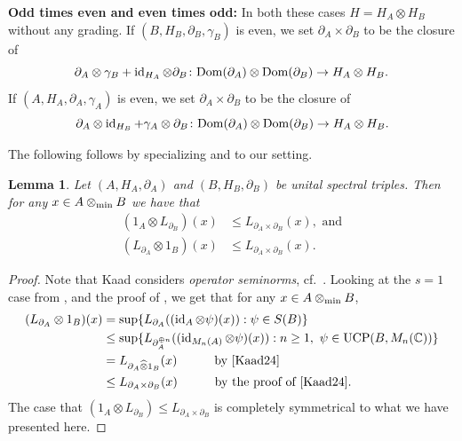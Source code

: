 \documentclass[11pt, a4paper, oneside, final, reqno]{amsart}
\newcommand{\bbC}{\mathbb{C}}
\newcommand{\UCP}{\operatorname{UCP}}
\newcommand{\id}{\operatorname{id}}
\theoremstyle{definition}
\theoremstyle{plain}
\newtheorem{lemma}[definition]{Lemma}
\theoremstyle{remark}
\numberwithin{equation}{section}
\begin{document}
\medskip \textbf{Odd times even and even times odd:} In both these cases $H = H_A \otimes H_B$ without any grading. If $(B,H_B,\partial_B,\gamma_B)$ is even, we set $\partial_A \times \partial_B$ to be the closure of
\begin{equation*}
    \partial_A \otimes \gamma_B + \id_{H_A} \otimes \partial_B \colon {\rm Dom}(\partial_A) \otimes {\rm Dom}(\partial_B) \to H_A \otimes H_B.
\end{equation*}
If $(A,H_A,\partial_A,\gamma_A)$ is even, we set $\partial_A \times \partial_B$ to be the closure of
\begin{equation*}
     \partial_A \otimes \id_{H_B} + \gamma_A \otimes \partial_B \colon {\rm Dom}(\partial_A) \otimes {\rm Dom}(\partial_B) \to H_A \otimes H_B.
\end{equation*}

The following follows by specializing \cite[Proposition 4.10]{Kaad24} and \cite[Theorem 7.1]{Kaad24} to our setting.

\begin{lemma}\label{thm:spectral triples Kaad}
    Let $(A,H_A,\partial_A)$ and $(B,H_B,\partial_B)$ be unital spectral triples. Then for any $x \in A \otimes_{\rm min} B$ we have that
    \begin{align*}
        (1_A \otimes L_{\partial_B})(x) & \leq L_{\partial_A \times \partial_B}(x), \text{ and} \\
        (L_{\partial_A} \otimes 1_B)(x) & \leq L_{\partial_A \times \partial_B}(x).
    \end{align*}
\end{lemma}
\begin{proof}
    Note that Kaad considers \emph{operator seminorms}, cf.~\cite[Definition 4.1]{Kaad24}. Looking at the $s = 1$ case from \cite[Proposition 4.10]{Kaad24}, and the proof of \cite[Theorem 7.1]{Kaad24}, we get that for any $x \in A \otimes_{\rm min} B$,
    \begin{align*}
        (L_{\partial_A} \otimes 1_B)(x)
        & = \sup\{ L_{\partial_A}((\id_{A} \otimes \psi)(x)) : \psi \in S(B) \} \\
        & \leq \sup\{ L_{\partial_{A}^{\oplus n}}((\id_{M_n(A)} \otimes \psi)(x)) : n \geq 1, \ \psi \in \UCP(B,M_n(\bbC)) \} \\
        & = L_{\partial_A \widehat{\otimes} 1_B}(x) \quad\quad\quad \text{by \cite[Proposition 4.10]{Kaad24}} \\
        & \leq L_{\partial_A \times \partial_B}(x) \quad\quad\quad \text{by the proof of \cite[Theorem 7.1]{Kaad24}}.
    \end{align*}
    The case that $(1_A \otimes L_{\partial_B}) \leq L_{\partial_A \times \partial_B}$ is completely symmetrical to what we have presented here.
\end{proof}
\end{document}
